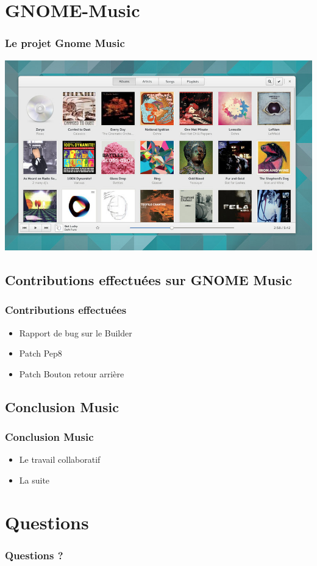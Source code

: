 \documentclass{beamer}
\begin{document}
\section{GNOME-Music}
\begin{frame}
  \frametitle{Le projet Gnome Music}
  \includegraphics[scale=0.325]{images/gnome-music-app.png}
\end{frame}

\subsection{Contributions effectuées sur GNOME Music}
\begin{frame}
  \frametitle{Contributions effectuées}
  \begin{itemize}
  \item Rapport de bug sur le Builder
  \item Patch Pep8
  \item Patch Bouton retour arrière
  \end{itemize}
\end{frame}

\subsection{Conclusion Music}
\begin{frame}
  \frametitle{Conclusion Music}
  \begin{itemize}
  \item Le travail collaboratif
  \item La suite
  \end{itemize}
\end{frame}

\section{Questions}
\begin{frame}
  \frametitle{Questions ?}
\end{frame}
\end{document}
